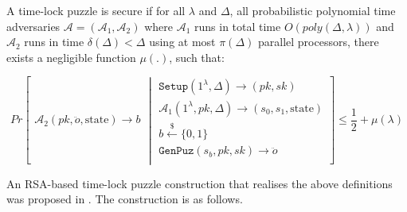 \begin{definition} A time-lock puzzle is secure if for all $\lambda$ and $\Delta$, all probabilistic polynomial time adversaries $\mathcal{A}=(\mathcal{A}_{\scriptscriptstyle 1},\mathcal{A}_{\scriptscriptstyle 2})$ where $\mathcal{A}_{\scriptscriptstyle 1}$ runs in total time $O(poly(\Delta,\lambda))$ and $\mathcal{A}_{\scriptscriptstyle 2}$ runs in  time $\delta(\Delta)<\Delta$ using at most $\pi(\Delta)$ parallel processors, there exists a negligible function $\mu(.)$, such that: 


$$ Pr\left[
  \begin{array}{l}
\mathcal{A}_{\scriptscriptstyle 2}(pk, \ddot{o},\text{state})  \rightarrow b
\end{array} \middle |
    \begin{array}{l}
\mathtt{Setup}(1^{\scriptscriptstyle\lambda},\Delta)\rightarrow (pk,sk)\\
\mathcal{A}_{\scriptscriptstyle 1}(1^{\scriptscriptstyle\lambda},pk, \Delta)\rightarrow (s_{\scriptscriptstyle 0},s_{\scriptscriptstyle 1},\text{state})\\
b\stackrel{\scriptscriptstyle\$}\leftarrow \{0,1\}\\
\mathtt {GenPuz}(s_{\scriptscriptstyle b}, pk, sk)\rightarrow \ddot{o}\\
\end{array}    \right]\leq \frac{1}{2}+\mu(\lambda)$$
\end{definition}





An  RSA-based time-lock puzzle construction that realises the above definitions was proposed in  \cite{Rivest:1996:TPT:888615}. The construction is as follows. 



\

